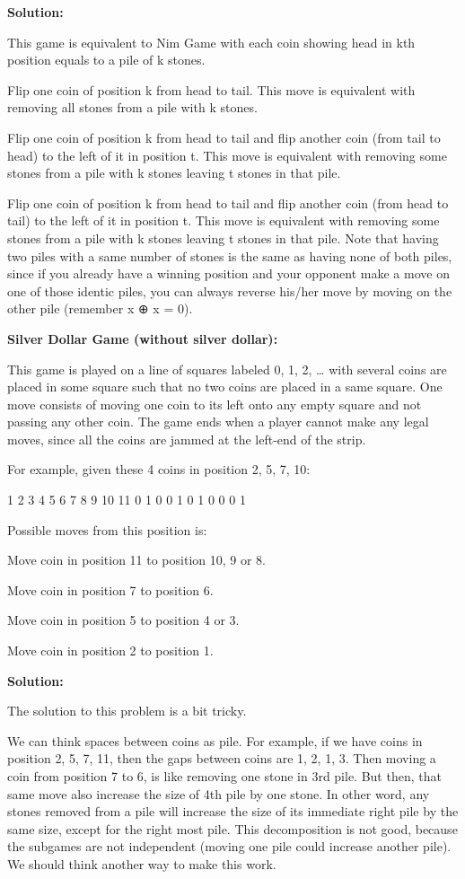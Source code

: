 \textbf{Solution:}

	This game is equivalent to Nim Game with each coin showing head in kth position equals to a pile of k stones.
	
	Flip one coin of position k from head to tail. This move is equivalent with removing all stones from a pile with k stones.

	Flip one coin of position k from head to tail and flip another coin (from tail to head) to the left of it in position t. This move is 		equivalent with removing some stones from a pile with k stones leaving t stones in that pile.

	Flip one coin of position k from head to tail and flip another coin (from head to tail) to the left of it in position t. This move is 		equivalent with removing some stones from a pile with k stones leaving t stones in that pile. Note that having two piles with a same 		number of stones is the same as having none of both piles, since if you already have a winning position and your opponent make a move on 		one of those identic piles, you can always reverse his/her move by moving on the other pile (remember x ⊕ x = 0).

\textbf{Silver Dollar Game (without silver dollar):}

This game is played on a line of squares labeled 0, 1, 2, … with several coins are placed in some square such that no two coins are placed in a same square. One move consists of moving one coin to its left onto any empty square and not passing any other coin. The game ends when a player cannot make any legal moves, since all the coins are jammed at the left-end of the strip.

For example, given these 4 coins in position {2, 5, 7, 10}:

1 2 3 4 5 6 7 8 9 10 11
0 1 0 0 1 0 1 0 0  0  1

Possible moves from this position is:

Move coin in position 11 to position 10, 9 or 8.

Move coin in position 7 to position 6.

Move coin in position 5 to position 4 or 3.

Move coin in position 2 to position 1.

\textbf{Solution:}

	The solution to this problem is a bit tricky.

	We can think spaces between coins as pile. For example, if we have coins in position {2, 5, 7, 11}, then the gaps between coins are {1, 2, 		1, 3}. Then moving a coin from position 7 to 6, is like removing one stone in 3rd pile. But then, that same move also increase the size of 		4th pile by one stone. In other word, any stones removed from a pile will increase the size of its immediate right pile by the same size, 		except for the right most pile. This decomposition is not good, because the subgames are not independent (moving one pile could increase 		another pile). We should think another way to make this work.

